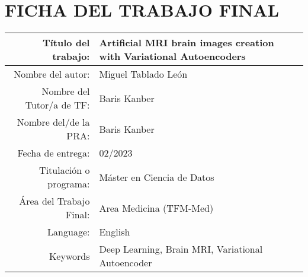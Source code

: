 \documentclass[11pt,a4paper,openany]{book}
\begin{document}



\tableofcontents

\chapter*{FICHA DEL TRABAJO FINAL}
\begin{table}[ht]
	\centering{}
	\renewcommand{\arraystretch}{2}
	\begin{tabular}{r | l}
		\hline
		Título del trabajo: & Artificial MRI brain images creation with Variational Autoencoders\\
		\hline
        Nombre del autor: & Miguel Tablado León\\
		\hline
        Nombre del Tutor/a de TF: & Baris Kanber\\
		\hline
        Nombre del/de la PRA: & Baris Kanber\\
		\hline
        Fecha de entrega: & 02/2023\\
		\hline
        Titulación o programa: & Máster en Ciencia de Datos\\
		\hline
        Área del Trabajo Final: & Area Medicina (TFM-Med)\\
		\hline
        Language: & English\\
		\hline
        Keywords & Deep Learning, Brain MRI, Variational Autoencoder\\
		\hline
	\end{tabular}
\end{table}
\end{document}
